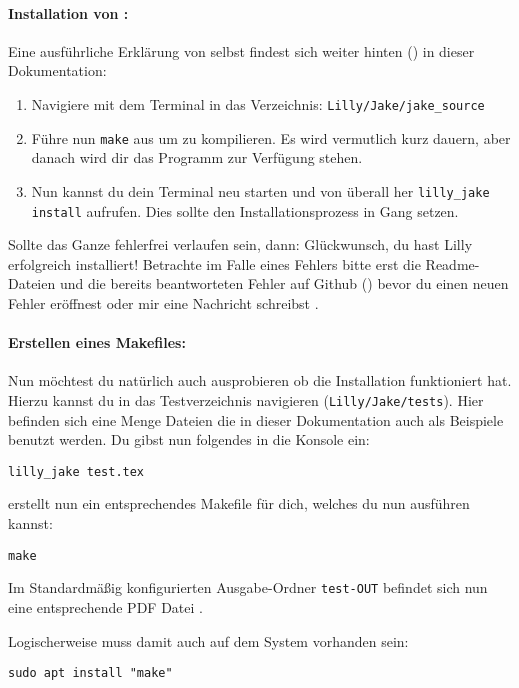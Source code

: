 \paragraph{Installation von \Jake:}Eine ausführliche Erklärung von \Jake selbst findest sich weiter hinten () in dieser Dokumentation:\smallskip
{}
\begin{enumerate}\setlength{\itemsep}{0.25\baselineskip}
    \item Navigiere mit dem Terminal in das Verzeichnis: \verb|Lilly/Jake/jake_source|
    \item Führe nun \verb|make| aus um \Jake zu kompilieren. 
          Es wird vermutlich kurz dauern, aber danach wird dir das Programm \LJake zur Verfügung stehen.
    \item Nun kannst du dein Terminal neu starten und von überall her \verb|lilly_jake install| aufrufen.
          Dies sollte den Installationsprozess in Gang setzen.\smallskip
\end{enumerate}
Sollte das Ganze fehlerfrei verlaufen sein, dann: Glückwunsch, du hast Lilly erfolgreich installiert!
Betrachte im Falle eines Fehlers bitte erst die Readme-Dateien und die bereits beantworteten Fehler
auf Github (\href{https://github.com/EagleoutIce/LILLY/issues}{\faGithub}) bevor du einen neuen Fehler
eröffnest oder mir eine Nachricht schreibst \Smiley.
\paragraph{Erstellen eines Makefiles:}
Nun möchtest du natürlich auch ausprobieren ob die Installation funktioniert hat. 
Hierzu kannst du in das Testverzeichnis navigieren (\verb|Lilly/Jake/tests|). 
Hier befinden sich eine Menge Dateien die in dieser Dokumentation auch als Beispiele benutzt werden.
Du gibst nun folgendes in die Konsole ein: 
\begin{lstlisting}[style=bash]
lilly_jake test.tex
\end{lstlisting}
\Jake erstellt nun ein entsprechendes Makefile für dich, welches du nun ausführen kannst:
\begin{lstlisting}[style=bash]
make 
\end{lstlisting}
Im Standardmäßig konfigurierten Ausgabe-Ordner \verb|test-OUT| befindet sich nun eine entsprechende PDF
Datei \Smiley.\smallskip
\begin{bemerkung}[make]
    Logischerweise muss damit auch  auf dem System vorhanden sein:
\begin{lstlisting}[style=bash]
sudo apt install "make"
\end{lstlisting}
\end{bemerkung}

